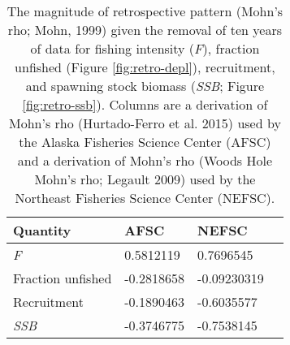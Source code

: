 
\begin{longtable}[t]{llll}
\caption{\label{tab:RetroMohnsrho}The magnitude of retrospective pattern (Mohn's rho; Mohn, 1999) given the removal of ten years of data for fishing intensity (\emph{F}), fraction unfished (Figure \ref{fig:retro-depl}),  recruitment, and spawning stock biomass (\emph{SSB}; Figure \ref{fig:retro-ssb}). Columns are a derivation of Mohn's rho (Hurtado-Ferro et al. 2015) used by the Alaska Fisheries Science Center (AFSC) and a derivation of Mohn's rho (Woods Hole Mohn's rho; Legault 2009) used by the Northeast Fisheries Science Center (NEFSC).}\\
\toprule
Quantity & AFSC & NEFSC\\
\midrule
\emph{F} & 0.5812119 & 0.7696545\\
Fraction unfished & -0.2818658 & -0.09230319\\
Recruitment & -0.1890463 & -0.6035577\\
\emph{SSB} & -0.3746775 & -0.7538145\\
\bottomrule
\end{longtable}
